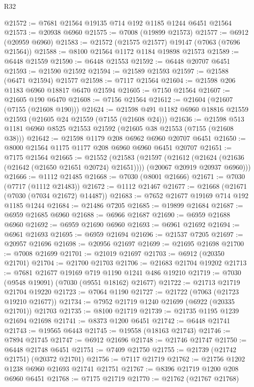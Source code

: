 \begin{lexlean}{R32}
\begin{coremodule}
@21572 := @7681 @21564 @19135 @714 @192 @1185 @1244 @6451 @21564
@21573 := @20938 @6960
@21575 := @7008 (@19899 @21573)
@21577 := @6912 (@20959 @6960)
@21583 := @21572 (@21575 @21577) @19147 (@7063 (@7696 @21564))
@21588 := @8100 @21564 @1172 @1184 @19898 @21573
@21589 := @6448 @21559
@21590 := @6448 @21553
@21592 := @6448 @20707 @6451
@21593 := @21590 @21592
@21594 := @21589 @21593
@21597 := @21588 (@6471 @21594) @21577
@21598 := @7117 @21564
@21604 := @21598 @206 @1183 @6960 @18817 @6470 @21594
@21605 := @7150 @21564
@21607 := @21605 @190 @6470
@21608 := @7156 @21564
@21612 := @21604 (@21607 (@7155 (@21608 @190)))
@21624 := @21598 @491 @1182 @6960 @18816 @21559 @21593 (@21605 @24 @21559 (@7155 (@21608 @24)))
@21636 := @21598 @513 @1181 @6960 @8525 @21553 @21592 (@21605 @38 @21553 (@7155 (@21608 @38)))
@21642 := @21598 @1179 @208 @6962 @6960 @20707 @6451
@21650 := @8000 @21564 @1175 @1177 @208 @6960 @6960 @6451 @20707
@21651 := @7175 @21564
@21665 := @21552
    (@21583
      (@21597
        (@21612 (@21624 (@21636 (@21642 (@21650 @21651 @20724) @21651))))
        (@20067 @20919 @20937 @6960)))
@21666 := @1112 @21485
@21668 := @7030 (@8001 @21666)
@21671 := @7030 (@7717 (@1112 @21483))
@21672 := @1112 @21467
@21677 := @21668 (@21671 (@7030 (@7034 @21672) @14487))
@21683 := @7652 @21677 @19169 @714 @192 @1185 @1244
@21684 := @21486 @7205
@21685 := @19899 @21684
@21687 := @6959 @21685 @6960
@21688 := @6966 @21687
@21690 := @6959 @21688 @6960
@21692 := @6959 @21690 @6960
@21693 := @6961 @21692
@21694 := @6961 @21693
@21695 := @6959 @21694
@21696 := @21537 @7205
@21697 := @20957 @21696
@21698 := @20956 @21697
@21699 := @21695 @21698
@21700 := @7008 @21699
@21701 := @21019 @21697
@21703 := @6912 (@20350 @21701)
@21704 := @21700 @21703
@21706 := @21683 @21704 @19202
@21713 := @7681 @21677 @19169 @719 @1190 @1241 @486 @19210
@21719 := @7030 (@9548 @19091) (@7030 (@9551 @18162) @21677)
@21722 := @21713 @21719 @21704 @19220
@21723 := @7064 @1190
@21727 := @21722 (@7063 (@21723 @19210 @21677))
@21734 := @7952 @21719 @1240 @21699 (@6922 (@20335 @21701)) @21703
@21735 := @8100 @21719
@21739 := @21735 @1195 @1239 @21694 @21698
@21741 := @8373 @1200 @6451
@21742 := @6448 @21741
@21743 := @19565 @6443
@21745 := @19558 (@18163 @21743)
@21746 := @7894 @21745
@21747 := @6912 @21696
@21748 := @21746 @21747
@21750 := @6448 @21748 @6451
@21751 := @7409 @21750
@21755 := @21739 (@21742 @21751) (@20372 @21701)
@21756 := @7117 @21719
@21762 := @21756 @1202 @1238 @6960 @21693 @21741 @21751
@21767 := @8396 @21719 @1200 @208 @6960 @6451
@21768 := @7175 @21719
@21770 := @21762 (@21767 @21768)

\end{coremodule}
\end{lexlean}
